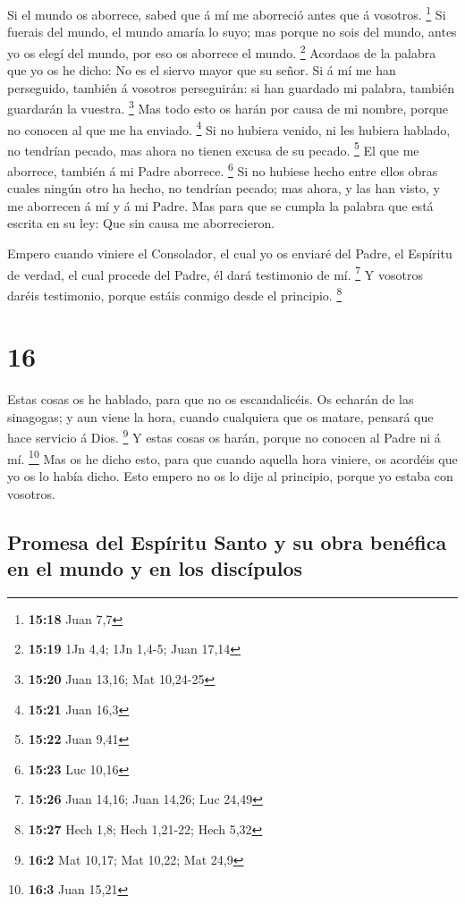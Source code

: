  Si el mundo os aborrece, sabed que á mí me aborreció antes
que á vosotros. \footnote{\textbf{15:18} Juan 7,7}  Si
fuerais del mundo, el mundo amaría lo suyo; mas porque no sois del
mundo, antes yo os elegí del mundo, por eso os aborrece el mundo.
\footnote{\textbf{15:19} 1Jn 4,4; 1Jn 1,4-5; Juan 17,14} 
Acordaos de la palabra que yo os he dicho: No es el siervo mayor que su
señor. Si á mí me han perseguido, también á vosotros perseguirán: si han
guardado mi palabra, también guardarán la vuestra. \footnote{\textbf{15:20}
  Juan 13,16; Mat 10,24-25}  Mas todo esto os harán por
causa de mi nombre, porque no conocen al que me ha enviado. \footnote{\textbf{15:21}
  Juan 16,3}  Si no hubiera venido, ni les hubiera hablado,
no tendrían pecado, mas ahora no tienen excusa de su pecado. \footnote{\textbf{15:22}
  Juan 9,41}  El que me aborrece, también á mi Padre
aborrece. \footnote{\textbf{15:23} Luc 10,16}  Si no
hubiese hecho entre ellos obras cuales ningún otro ha hecho, no tendrían
pecado; mas ahora, y las han visto, y me aborrecen á mí y á mi Padre.
 Mas para que se cumpla la palabra que está escrita en su
ley: Que sin causa me aborrecieron.

 Empero cuando viniere el Consolador, el cual yo os enviaré
del Padre, el Espíritu de verdad, el cual procede del Padre, él dará
testimonio de mí. \footnote{\textbf{15:26} Juan 14,16; Juan 14,26; Luc
  24,49}  Y vosotros daréis testimonio, porque estáis
conmigo desde el principio. \footnote{\textbf{15:27} Hech 1,8; Hech
  1,21-22; Hech 5,32}

\hypertarget{section-15}{%
\section{16}\label{section-15}}

 Estas cosas os he hablado, para que no os escandalicéis.
 Os echarán de las sinagogas; y aun viene la hora, cuando
cualquiera que os matare, pensará que hace servicio á Dios. \footnote{\textbf{16:2}
  Mat 10,17; Mat 10,22; Mat 24,9}  Y estas cosas os harán,
porque no conocen al Padre ni á mí. \footnote{\textbf{16:3} Juan 15,21}
 Mas os he dicho esto, para que cuando aquella hora viniere,
os acordéis que yo os lo había dicho. Esto empero no os lo dije al
principio, porque yo estaba con vosotros.

\hypertarget{promesa-del-espuxedritu-santo-y-su-obra-benuxe9fica-en-el-mundo-y-en-los-discuxedpulos}{%
\subsection{Promesa del Espíritu Santo y su obra benéfica en el mundo y
en los
discípulos}\label{promesa-del-espuxedritu-santo-y-su-obra-benuxe9fica-en-el-mundo-y-en-los-discuxedpulos}}

